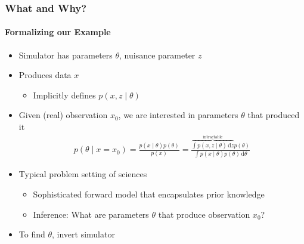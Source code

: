 \documentclass[9pt, aspectratio=169]{beamer}
\newcommand{\diff}{\,\mathrm{d}}
\begin{document}
\begin{frame}
\frametitle{What and Why?}
\framesubtitle{Formalizing our Example}
\begin{itemize}
	\item Simulator has parameters $\theta$, nuisance parameter $z$
	\item Produces data $x$
	\begin{itemize}
		\item Implicitly defines $p(x,z\mid\theta)$ %
	\end{itemize}
	\item Given (real) observation $x_0$, we are interested in parameters $\theta$ that produced it
	\begin{align}
p(\theta\mid x=x_0) = \frac{p(x\mid\theta)p(\theta)}{p(x)} = \frac{\overbrace{\int p(x,z\mid\theta)\diff z}^{\text{intractable}} p(\theta)}{\int p(x\mid\theta)p(\theta) \diff \theta}
\end{align}
\item Typical problem setting of sciences%
\begin{itemize}
			\item Sophisticated forward model that encapsulates prior knowledge
	\item Inference: What are parameters $\theta$ that produce observation $x_0$?
\end{itemize}
\item To find $\theta$, invert simulator
\end{itemize}
\end{frame} 
\end{document}
